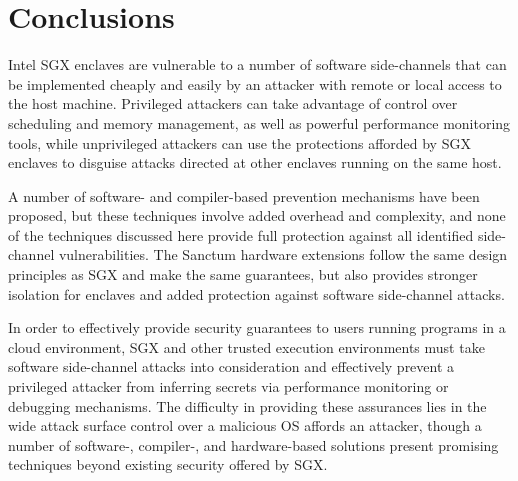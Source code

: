 \section{Conclusions}

Intel SGX enclaves are vulnerable to a number of software side-channels that can be implemented cheaply and easily by an attacker with remote or local access to the host machine. Privileged attackers can take advantage of control over scheduling and memory management, as well as powerful performance monitoring tools, while unprivileged attackers can use the protections afforded by SGX enclaves to disguise attacks directed at other enclaves running on the same host. 

A number of software- and compiler-based prevention mechanisms have been proposed, but these techniques involve added overhead and complexity, and none of the techniques discussed here provide full protection against all identified side-channel vulnerabilities. The Sanctum hardware extensions follow the same design principles as SGX and make the same guarantees, but also provides stronger isolation for enclaves and added protection against software side-channel attacks. 

In order to effectively provide security guarantees to users running programs in a cloud environment, SGX and other trusted execution environments must take software side-channel attacks into consideration and effectively prevent a privileged attacker from inferring secrets via performance monitoring or debugging mechanisms. The difficulty in providing these assurances lies in the wide attack surface control over a malicious OS affords an attacker, though a number of software-, compiler-, and hardware-based solutions present promising techniques beyond existing security offered by SGX. 
